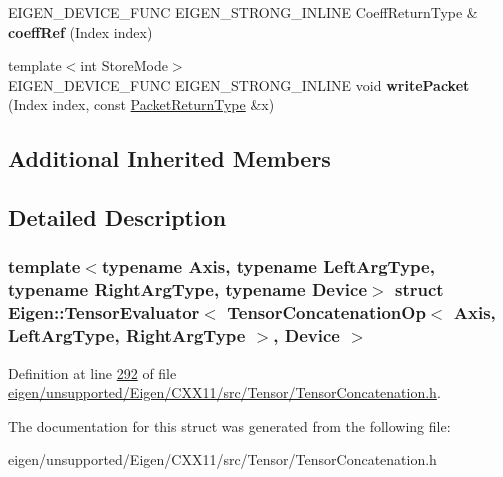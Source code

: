 \begin{DoxyCompactItemize}
\item 
\mbox{\label{struct_eigen_1_1_tensor_evaluator_3_01_tensor_concatenation_op_3_01_axis_00_01_left_arg_type_00_7f27325ca3102a6730769e76427d2ca7_a9bdc51804248d7d4ea58d05f2494c77b}} 
E\+I\+G\+E\+N\+\_\+\+D\+E\+V\+I\+C\+E\+\_\+\+F\+U\+NC E\+I\+G\+E\+N\+\_\+\+S\+T\+R\+O\+N\+G\+\_\+\+I\+N\+L\+I\+NE Coeff\+Return\+Type \& {\bfseries coeff\+Ref} (Index index)
\item 
\mbox{\label{struct_eigen_1_1_tensor_evaluator_3_01_tensor_concatenation_op_3_01_axis_00_01_left_arg_type_00_7f27325ca3102a6730769e76427d2ca7_a15e92f86e149c8a0ea398b8f4ad9e06f}} 
{\footnotesize template$<$int Store\+Mode$>$ }\\E\+I\+G\+E\+N\+\_\+\+D\+E\+V\+I\+C\+E\+\_\+\+F\+U\+NC E\+I\+G\+E\+N\+\_\+\+S\+T\+R\+O\+N\+G\+\_\+\+I\+N\+L\+I\+NE void {\bfseries write\+Packet} (Index index, const \hyperlink{group___sparse_core___module}{Packet\+Return\+Type} \&x)
\end{DoxyCompactItemize}
\subsection*{Additional Inherited Members}


\subsection{Detailed Description}
\subsubsection*{template$<$typename Axis, typename Left\+Arg\+Type, typename Right\+Arg\+Type, typename Device$>$\newline
struct Eigen\+::\+Tensor\+Evaluator$<$ Tensor\+Concatenation\+Op$<$ Axis, Left\+Arg\+Type, Right\+Arg\+Type $>$, Device $>$}



Definition at line \hyperlink{eigen_2unsupported_2_eigen_2_c_x_x11_2src_2_tensor_2_tensor_concatenation_8h_source_l00292}{292} of file \hyperlink{eigen_2unsupported_2_eigen_2_c_x_x11_2src_2_tensor_2_tensor_concatenation_8h_source}{eigen/unsupported/\+Eigen/\+C\+X\+X11/src/\+Tensor/\+Tensor\+Concatenation.\+h}.



The documentation for this struct was generated from the following file\+:\begin{DoxyCompactItemize}
\item 
eigen/unsupported/\+Eigen/\+C\+X\+X11/src/\+Tensor/\+Tensor\+Concatenation.\+h\end{DoxyCompactItemize}
